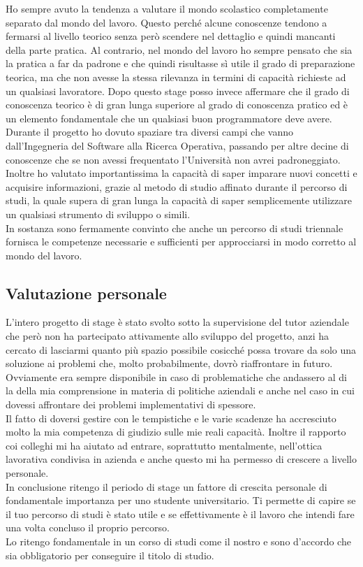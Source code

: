 Ho sempre avuto la tendenza a valutare il mondo scolastico completamente separato dal mondo del lavoro. Questo perché alcune conoscenze tendono a fermarsi al livello teorico
senza però scendere nel dettaglio e quindi mancanti della parte pratica. Al contrario, nel mondo del lavoro ho sempre pensato che sia la pratica a far da padrone e che quindi
risultasse sì utile il grado di preparazione teorica, ma che non avesse la stessa rilevanza in termini di capacità richieste ad un qualsiasi lavoratore. Dopo questo stage posso
invece affermare che il grado di conoscenza teorico è di gran lunga superiore al grado di conoscenza pratico ed è un elemento fondamentale che un qualsiasi buon programmatore 
deve avere.\\ Durante il progetto ho dovuto spaziare tra diversi campi che vanno dall'Ingegneria del Software alla Ricerca Operativa, passando per altre decine di conoscenze
che se non avessi frequentato l'Università non avrei padroneggiato. Inoltre ho valutato importantissima la capacità di saper imparare nuovi concetti e acquisire informazioni,
grazie al metodo di studio affinato durante il percorso di studi, la quale supera di gran lunga la capacità di saper semplicemente utilizzare un qualsiasi strumento
di sviluppo o simili.\\ In sostanza sono fermamente convinto che anche un percorso di studi triennale fornisca le competenze necessarie e sufficienti per approcciarsi in modo
corretto al mondo del lavoro.

\subsection{Valutazione personale}

L'intero progetto di stage è stato svolto sotto la supervisione del tutor aziendale che però non ha partecipato attivamente allo sviluppo del progetto, anzi ha cercato di 
lasciarmi quanto più spazio possibile cosicché possa trovare da solo una soluzione ai problemi che, molto probabilmente, dovrò riaffrontare in futuro. Ovviamente era sempre
disponibile in caso di problematiche che andassero al di la della mia comprensione in materia di politiche aziendali e anche nel caso in cui dovessi affrontare dei problemi
implementativi di spessore.\\ Il fatto di doversi gestire con le tempistiche e le varie scadenze ha accresciuto molto la mia competenza di giudizio sulle mie reali capacità.
Inoltre il rapporto coi colleghi mi ha aiutato ad entrare, soprattutto mentalmente, nell'ottica lavorativa condivisa in azienda e anche questo mi ha permesso di crescere
a livello personale.\\ In conclusione ritengo il periodo di stage un fattore di crescita personale di fondamentale importanza per uno studente universitario. Ti permette di capire
se il tuo percorso di studi è stato utile e se effettivamente è il lavoro che intendi fare una volta concluso il proprio percorso.\\ Lo ritengo fondamentale in un corso di studi
come il nostro e sono d'accordo che sia obbligatorio per conseguire il titolo di studio.